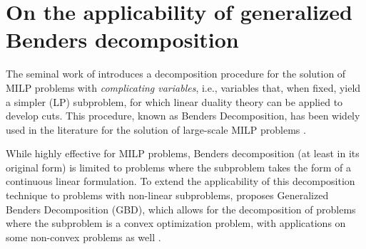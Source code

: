 \documentclass[pdflatex,sn-mathphys-num]{sn-jnl}%
\begin{document}
\section{On the applicability of generalized Benders decomposition}\label{sec6}


The seminal work of \citet{Benders} introduces a decomposition procedure for the solution of MILP problems with \textit{complicating variables}, i.e., variables that, when fixed, yield a simpler (LP) subproblem, for which linear duality theory can be applied to develop cuts. This procedure, known as Benders Decomposition, has been widely used in the literature for the solution of large-scale MILP problems \cite{benders-survey}. 

While highly effective for MILP problems, Benders decomposition (at least in its original form) is limited to problems where the subproblem takes the form of a continuous linear formulation. To extend the applicability of this decomposition technique to problems with non-linear subproblems, \citet{gbd} proposes Generalized Benders Decomposition (GBD), which allows for the decomposition of problems where the subproblem is a convex optimization problem, with applications on some non-convex problems as well \cite{gbd-applications}.
\end{document}
